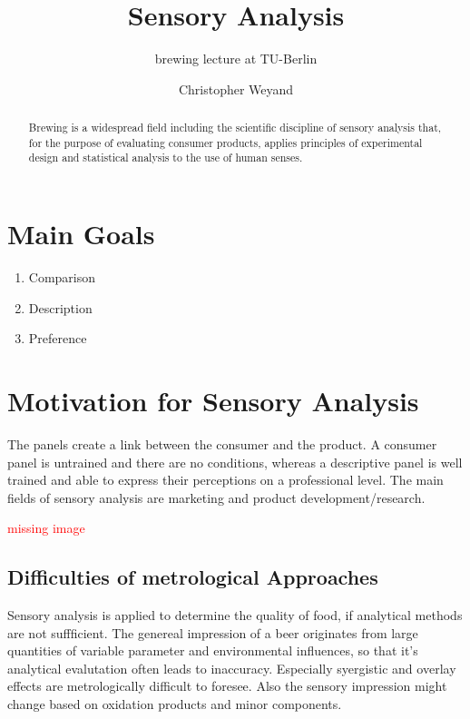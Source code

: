 \documentclass[]{scrartcl}
\begin{document}
\title{Sensory Analysis}
\subtitle{brewing lecture at TU-Berlin}
\author{Christopher Weyand}
\maketitle
\begin{abstract}
Brewing is a widespread field including the scientific discipline of sensory analysis
that, for the purpose of evaluating consumer products, applies principles of experimental
design and statistical analysis to the use of human senses.
\end{abstract}
\newpage

\tableofcontents
\newpage

\listoffigures
\newpage


\section{Main Goals}
\begin{enumerate}
  \item Comparison
  \item Description
  \item Preference
\end{enumerate}

\section{Motivation for Sensory Analysis}
The panels create a link between the consumer and the product.
A consumer panel is untrained and there are no conditions, whereas a
descriptive panel is well trained and able to express their perceptions
on a professional level. The main fields of sensory analysis
are marketing and product development/research.

\textcolor{red}{missing image}

\subsection{Difficulties of metrological Approaches}
Sensory analysis is applied to determine the quality of food, if analytical
methods are not suffficient. The genereal impression of a beer originates from
large quantities of variable parameter and environmental influences,
so that it's analytical evalutation often leads to inaccuracy.
Especially syergistic and overlay effects are metrologically difficult to foresee.
Also the sensory impression might change based on oxidation products and
minor components.
\end{document}
